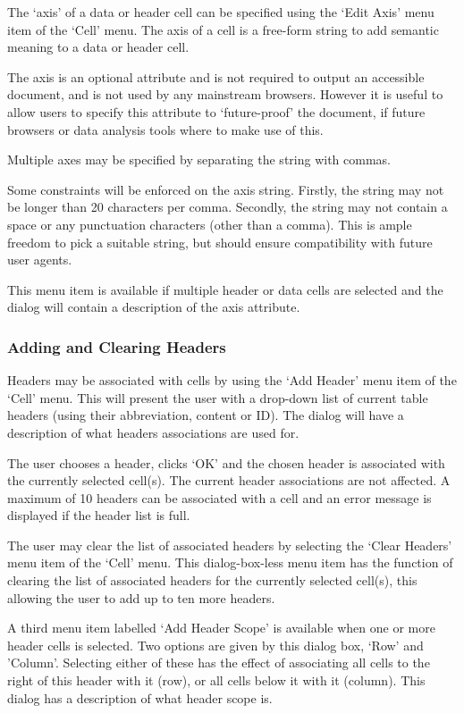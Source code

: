 The `axis' of a data or header cell can be specified using the `Edit Axis'
menu item of the `Cell' menu. The axis of a cell is a free-form string to add
semantic meaning to a data or header cell.

The axis is an optional attribute and is not required to output an accessible
document, and is not used by any mainstream browsers. However it is useful to
allow users to specify this attribute to `future-proof' the document, if future
browsers or data analysis tools where to make use of this.

Multiple axes may be specified by separating the string with commas.

Some constraints will be enforced on the axis string. Firstly, the string may not be
longer than 20 characters per comma. Secondly, the string may not contain a
space or any punctuation characters (other than a comma). This is ample freedom
to pick a suitable string, but should ensure compatibility with future user
agents.

This menu item is available if multiple header or data cells are selected and
the dialog will contain a description of the axis attribute.

\subsubsection{Adding and Clearing Headers}

Headers may be associated with cells by using the `Add Header' menu item of the
`Cell' menu. This will present the user with a drop-down list of current table
headers (using their abbreviation, content or ID). The dialog will have a
description of what headers associations are used for.

The user chooses a header, clicks `OK' and the chosen header is associated with
the currently selected cell(s). The current header associations are not
affected. A maximum of 10 headers can be associated with a cell and an error
message is displayed if the header list is full.

The user may clear the list of associated headers by selecting the `Clear
Headers' menu item of the `Cell' menu. This dialog-box-less menu item has the
function of clearing the list of associated headers for the currently selected
cell(s), this allowing the user to add up to ten more headers.

A third menu item labelled `Add Header Scope' is available when one or more
header cells is selected. Two options are given by this dialog box, `Row' and
'Column'. Selecting either of these has the effect of associating all cells to
the right of this header with it (row), or all cells below it with it (column).
This dialog has a description of what header scope is.

